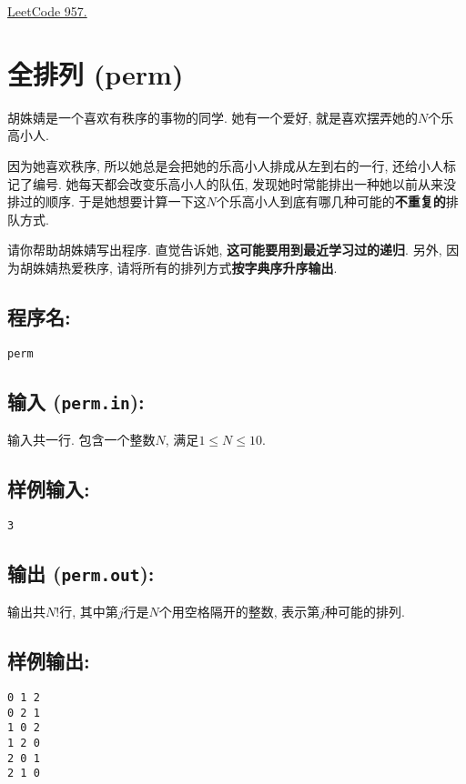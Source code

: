 \documentclass{article}
\begin{document}
\href{https://leetcode-cn.com/problems/prison-cells-after-n-days}{LeetCode 957.}

\section{全排列 (perm)}
\label{sec:perm}

胡姝婧是一个喜欢有秩序的事物的同学.
她有一个爱好, 就是喜欢摆弄她的$N$个乐高小人.

因为她喜欢秩序, 所以她总是会把她的乐高小人排成从左到右的一行, 还给小人标记了编号.
她每天都会改变乐高小人的队伍, 发现她时常能排出一种她以前从来没排过的顺序.
于是她想要计算一下这$N$个乐高小人到底有哪几种可能的\textbf{不重复的}排队方式.

请你帮助胡姝婧写出程序.
直觉告诉她, \textbf{这可能要用到最近学习过的递归}.
另外, 因为胡姝婧热爱秩序, 请将所有的排列方式\textbf{按字典序升序输出}.

\subsection*{程序名:}

\texttt{perm}

\subsection*{输入 (\texttt{perm.in}):}

输入共一行. 包含一个整数$N$, 满足$1\le N\le10$.

\subsection*{样例输入:}

\begin{verbatim}
3
\end{verbatim}

\subsection*{输出 (\texttt{perm.out}):}

输出共$N!$行, 其中第$j$行是$N$个用空格隔开的整数, 表示第$j$种可能的排列.

\subsection*{样例输出:}

\begin{verbatim}
0 1 2
0 2 1
1 0 2
1 2 0
2 0 1
2 1 0
\end{verbatim}
\end{document}
